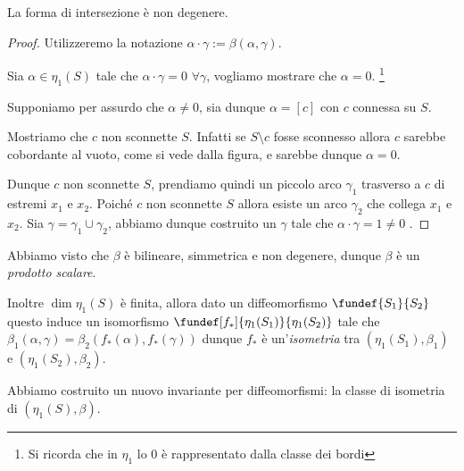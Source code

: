 \begin{teo}
 La forma di intersezione è non degenere.
\end{teo}

\begin{proof}
Utilizzeremo la notazione $\alpha \cdot \gamma := \beta(\alpha,\gamma)$.

Sia $\alpha \in \eta_1(S)$ tale che $\alpha \cdot \gamma = 0$  $\forall \gamma$, vogliamo mostrare che  $\alpha = 0$.
\footnote{Si ricorda che in $\eta_1$ lo 0 è rappresentato dalla classe dei bordi}

Supponiamo per assurdo che $\alpha \neq 0$, sia dunque $\alpha = [c]$ con $c$ connessa su $S$.

Mostriamo che $c$ non sconnette $S$. Infatti se $S \setminus c$ fosse sconnesso allora $c$ sarebbe cobordante al vuoto, come si vede dalla figura, e sarebbe dunque $\alpha = 0$.
\begin{center}
  
\end{center}
Dunque $c$ non sconnette $S$, prendiamo quindi un piccolo arco $\gamma_1$ trasverso a $c$ di estremi $x_1$ e $x_2$. Poiché $c$ non sconnette $S$ allora esiste un arco $\gamma_2$ che collega $x_1$ e $x_2$. Sia $\gamma = \gamma_1 \cup \gamma_2$, abbiamo dunque costruito un $\gamma$ tale che $\alpha \cdot \gamma = 1 \neq 0$ \absurd.
\end{proof}
\begin{center}
  
\end{center}

\begin{oss}
Abbiamo visto che $\beta$ è bilineare, simmetrica e non degenere, dunque $\beta$ è un \emph{prodotto scalare}.

Inoltre $\dim \eta_1(S)$ è finita, allora dato un diffeomorfismo $\fundef{S_1}{S_2}$ questo induce un isomorfismo $\fundef[f_*]{\eta_1(S_1)}{\eta_1(S_2)}$ tale che $\beta_1(\alpha,\gamma) = \beta_2(f_*(\alpha),f_*(\gamma))$ dunque $f_*$ è un'\emph{isometria} tra $(\eta_1(S_1), \beta_1)$ e $(\eta_1(S_2), \beta_2)$.

Abbiamo costruito un nuovo invariante per diffeomorfismi: la classe di isometria di $(\eta_1(S), \beta)$.
\end{oss}
